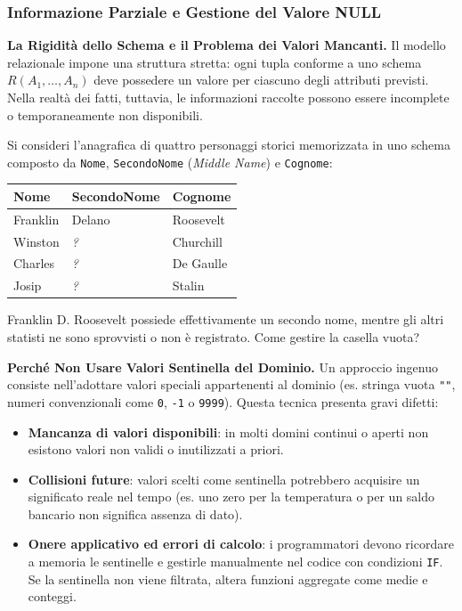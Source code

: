 \documentclass[12pt]{extarticle}
\begin{document}
\subsubsection{Informazione Parziale e Gestione del Valore NULL}
\noindent \textbf{La Rigidità dello Schema e il Problema dei Valori Mancanti.} Il modello relazionale impone una struttura stretta: ogni tupla conforme a uno schema $R(A_1, \dots, A_n)$ deve possedere un valore per ciascuno degli attributi previsti. Nella realtà dei fatti, tuttavia, le informazioni raccolte possono essere incomplete o temporaneamente non disponibili.

\medskip
\noindent Si consideri l'anagrafica di quattro personaggi storici memorizzata in uno schema composto da \texttt{Nome}, \texttt{SecondoNome} (\textit{Middle Name}) e \texttt{Cognome}:
\begin{center}
\small
\begin{tabular}{lll}
    \toprule
    \textbf{Nome} & \textbf{SecondoNome} & \textbf{Cognome} \\
    \midrule
    Franklin & Delano & Roosevelt \\
    Winston & \textit{?} & Churchill \\
    Charles & \textit{?} & De Gaulle \\
    Josip & \textit{?} & Stalin \\
    \bottomrule
\end{tabular}
\end{center}
Franklin D. Roosevelt possiede effettivamente un secondo nome, mentre gli altri statisti ne sono sprovvisti o non è registrato. Come gestire la casella vuota?

\medskip
\noindent \textbf{Perché Non Usare Valori Sentinella del Dominio.} Un approccio ingenuo consiste nell'adottare valori speciali appartenenti al dominio (es. stringa vuota \texttt{""}, numeri convenzionali come \texttt{0}, \texttt{-1} o \texttt{9999}). Questa tecnica presenta gravi difetti:
\begin{itemize}
    \item \textbf{Mancanza di valori disponibili}: in molti domini continui o aperti non esistono valori non validi o inutilizzati a priori.
    \item \textbf{Collisioni future}: valori scelti come sentinella potrebbero acquisire un significato reale nel tempo (es. uno zero per la temperatura o per un saldo bancario non significa assenza di dato).
    \item \textbf{Onere applicativo ed errori di calcolo}: i programmatori devono ricordare a memoria le sentinelle e gestirle manualmente nel codice con condizioni \texttt{IF}. Se la sentinella non viene filtrata, altera funzioni aggregate come medie e conteggi.
\end{itemize}
\end{document}

